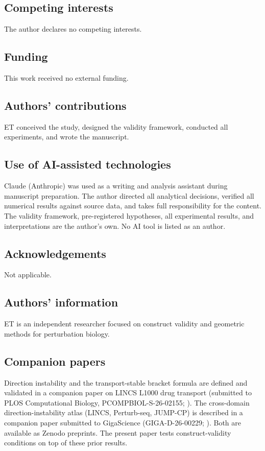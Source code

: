 \documentclass[11pt]{article}
\begin{document}
\subsection*{Competing interests}
The author declares no competing interests.

\subsection*{Funding}
This work received no external funding.

\subsection*{Authors' contributions}
ET conceived the study, designed the validity framework, conducted
all experiments, and wrote the manuscript.

\subsection*{Use of AI-assisted technologies}
Claude (Anthropic) was used as a writing and analysis assistant during manuscript preparation. The author directed all analytical decisions, verified all numerical results against source data, and takes full responsibility for the content. The validity framework, pre-registered hypotheses, all experimental results, and interpretations are the author's own. No AI tool is listed as an author.

\subsection*{Acknowledgements}
Not applicable.

\subsection*{Authors' information}
ET is an independent researcher focused on construct validity
and geometric methods for perturbation biology.

\subsection*{Companion papers}
Direction instability and the transport-stable bracket formula are
defined and validated in a companion paper on LINCS L1000 drug
transport (submitted to PLOS Computational Biology,
PCOMPBIOL-S-26-02155; \citep{tower2026drug}). The cross-domain
direction-instability atlas (LINCS, Perturb-seq, JUMP-CP) is
described in a companion paper submitted to GigaScience
(GIGA-D-26-00229; \citep{tower2026atlas}). Both are available as
Zenodo preprints. The present paper tests construct-validity
conditions on top of these prior results.



\end{document}
